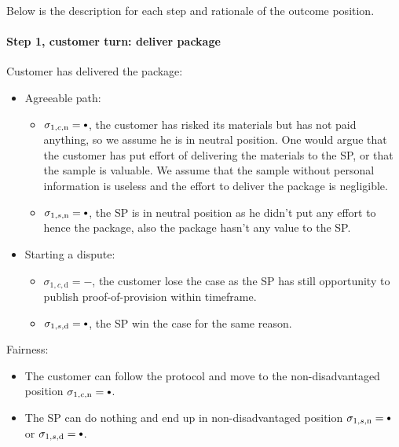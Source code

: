 \documentclass{ieeeaccess}
\newcommand\sbullet[1][.75]{\mathbin{\ThisStyle{\vcenter{\hbox{%
  \scalebox{#1}{$\SavedStyle\bullet$}}}}}%
}
\begin{document}
Below is the description for each step and rationale of the outcome position.

\paragraph{Step 1, customer turn: deliver package}\label{step-1-deliver-package}

Customer has delivered the package:

\begin{itemize}
\item
  Agreeable path:

  \begin{itemize}
  
  \item
    \(\sigma_{1, c, \mathrm{n}} = \sbullet\), the customer has risked its
    materials but has not paid anything, so we assume he is in neutral
    position. One would argue that the customer has put effort of
    delivering the materials to the SP, or that the sample is valuable.
    We assume that the sample without personal information is useless
    and the effort to deliver the package is negligible.
  \item
    \(\sigma_{1, s, \mathrm{n}} = \sbullet\), the SP is in neutral position as he didn't put any effort to hence the package, also the package hasn't any value to the SP.
  \end{itemize}
\item
  Starting a dispute:

  \begin{itemize}
  
  \item
    \(\sigma_{1, c, \mathrm{d}} = -\), the customer lose the case as the SP has still opportunity to publish proof-of-provision within timeframe.
  \item
    \(\sigma_{1, s, \mathrm{d}} = \sbullet\), the SP win the case for the same reason.
  \end{itemize}
\end{itemize}

Fairness:

\begin{itemize}

\item
  The customer can follow the protocol and move to the non-disadvantaged
  position \(\sigma_{1, c, \mathrm{n}} = \sbullet\).
\item
  The SP can do nothing and end up in non-disadvantaged position
  \(\sigma_{1, s, \mathrm{n}} = \sbullet \) or
  \(\sigma_{1, s, \mathrm{d}} = \sbullet \).
\end{itemize}
\end{document}
